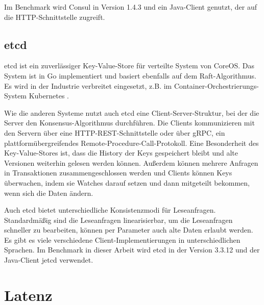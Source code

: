 Im Benchmark wird Consul in Version 1.4.3 und ein Java-Client \cite{consul-client} genutzt, der auf die HTTP-Schnittstelle zugreift.

\subsection{etcd}

etcd \cite{etcd} ist ein zuverlässiger Key-Value-Store für verteilte System von CoreOS. Das System ist in Go implementiert und basiert ebenfalls auf dem Raft-Algorithmus. Es wird in der Industrie verbreitet eingesetzt, z.B. im Container-Orchestrierungs-System Kubernetes \cite{kubernetes}.

Wie die anderen Systeme nutzt auch etcd eine Client-Server-Struktur, bei der die Server den Konsensus-Algorithmus durchführen. Die Clients kommunizieren mit den Servern über eine HTTP-REST-Schnittstelle oder über gRPC, ein plattformübergreifendes Remote-Procedure-Call-Protokoll. Eine Besonderheit des Key-Value-Stores ist, dass die History der Keys gespeichert bleibt und alte Versionen weiterhin gelesen werden können. Außerdem können mehrere Anfragen in Transaktionen zusammengeschlossen werden und Clients können Keys überwachen, indem sie Watches darauf setzen und dann mitgeteilt bekommen, wenn sich die Daten ändern.

Auch etcd bietet unterschiedliche Konsistenzmodi für Leseanfragen. Standardmäßig sind die Leseanfragen linearisierbar, um die Leseanfragen schneller zu bearbeiten, können per Parameter auch alte Daten erlaubt werden. Es gibt es viele verschiedene Client\hyp{}Implementierungen in unterschiedlichen Sprachen. Im Benchmark in dieser Arbeit wird etcd in der Version 3.3.12 und der Java-Client jetcd \cite{jetcd} verwendet.

\section{Latenz}
\label{latency}

